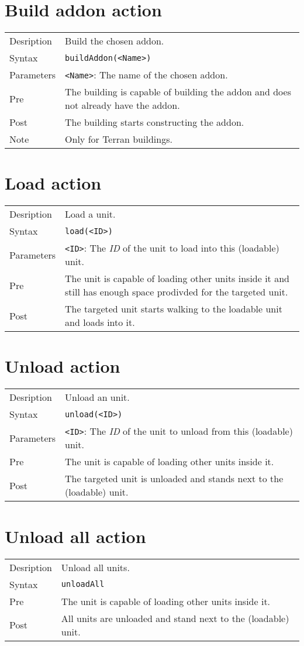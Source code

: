 \section{Build addon action}
\begin{tabularx}{\textwidth}{lX}
 Desription & Build the chosen addon. \\
 Syntax & \verb|buildAddon(<Name>)| \\
 Parameters & \verb|<Name>|: The name of the chosen addon.\\
 Pre & The building is capable of building the addon and does not already have the addon. \\
 Post & The building starts constructing the addon. \\
 Note & Only for Terran buildings.
\end{tabularx}

\section{Load action}
\begin{tabularx}{\textwidth}{lX}
 Desription & Load a unit. \\
 Syntax & \verb|load(<ID>)| \\
 Parameters & \verb|<ID>|: The \textit{ID} of the unit to load into this (loadable) unit.\\
 Pre & The unit is capable of loading other units inside it and still has enough space prodivded for the targeted unit. \\
 Post & The targeted unit starts walking to the loadable unit and loads into it.
\end{tabularx}

\section{Unload action}
\begin{tabularx}{\textwidth}{lX}
 Desription & Unload an unit. \\
 Syntax & \verb|unload(<ID>)| \\
 Parameters & \verb|<ID>|: The \textit{ID} of the unit to unload from this (loadable) unit.\\
 Pre & The unit is capable of loading other units inside it. \\
 Post & The targeted unit is unloaded and stands next to the (loadable) unit.
\end{tabularx}

\section{Unload all action}
\begin{tabularx}{\textwidth}{lX}
 Desription & Unload all units. \\
 Syntax & \verb|unloadAll| \\
 Pre & The unit is capable of loading other units inside it. \\
 Post & All units are unloaded and stand next to the (loadable) unit.
\end{tabularx}

